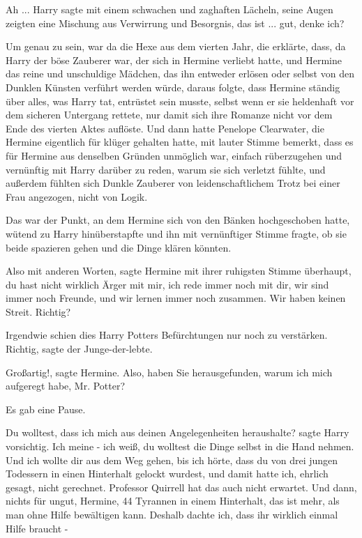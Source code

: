\glqq Ah ...\grqq{} Harry sagte mit einem schwachen und zaghaften Lächeln, seine
Augen zeigten eine Mischung aus Verwirrung und Besorgnis, \glqq das ist ... gut,
denke ich?\grqq{}

Um genau zu sein, war da die Hexe aus dem vierten Jahr, die erklärte, dass, da
Harry der böse Zauberer war, der sich in Hermine verliebt hatte, und Hermine das
reine und unschuldige Mädchen, das ihn entweder erlösen oder selbst von den
Dunklen Künsten verführt werden würde, daraus folgte, dass Hermine ständig über
alles, was Harry tat, entrüstet sein musste, selbst wenn er sie heldenhaft vor
dem sicheren Untergang rettete, nur damit sich ihre Romanze nicht vor dem Ende
des vierten Aktes auflöste. Und dann hatte Penelope Clearwater, die Hermine
eigentlich für klüger gehalten hatte, mit lauter Stimme bemerkt, dass es für
Hermine aus denselben Gründen unmöglich war, einfach rüberzugehen und vernünftig
mit Harry darüber zu reden, warum sie sich verletzt fühlte, und außerdem fühlten
sich Dunkle Zauberer von leidenschaftlichem Trotz bei einer Frau angezogen,
nicht von Logik.

Das war der Punkt, an dem Hermine sich von den Bänken hochgeschoben hatte,
wütend zu Harry hinüberstapfte und ihn mit vernünftiger Stimme fragte, ob sie
beide spazieren gehen und die Dinge klären könnten.

\glqq Also mit anderen Worten\grqq{}, sagte Hermine mit ihrer ruhigsten Stimme
überhaupt, \glqq du hast nicht wirklich Ärger mit mir, ich rede immer noch mit
dir, wir sind immer noch Freunde, und wir lernen immer noch zusammen. Wir haben
keinen Streit. Richtig?\grqq{}

Irgendwie schien dies Harry Potters Befürchtungen nur noch zu verstärken. \glqq
Richtig\grqq{}, sagte der Junge-der-lebte.

\glqq Großartig!\grqq{}, sagte Hermine. \glqq Also, haben Sie herausgefunden,
warum ich mich aufgeregt habe, Mr. Potter?\grqq{}

Es gab eine Pause.

\glqq Du wolltest, dass ich mich aus deinen Angelegenheiten heraushalte?\grqq{}
sagte Harry vorsichtig. \glqq Ich meine - ich weiß, du wolltest die Dinge selbst
in die Hand nehmen. Und ich wollte dir aus dem Weg gehen, bis ich hörte, dass du
von drei jungen Todessern in einen Hinterhalt gelockt wurdest, und damit hatte
ich, ehrlich gesagt, nicht gerechnet. Professor Quirrell hat das auch nicht
erwartet. Und dann, nichts für ungut, Hermine, 44 Tyrannen in einem Hinterhalt,
das ist mehr, als man ohne Hilfe bewältigen kann. Deshalb dachte ich, dass ihr
wirklich einmal Hilfe braucht -\grqq{}


